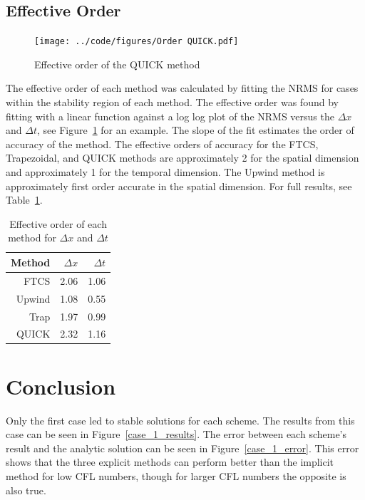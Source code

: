 \documentclass[twocolumn,10pt]{asme2ej}
\begin{document}
\subsection{Effective Order}
\begin{figure}[tb]
\begin{center}
\texttt{[image: ../code/figures/Order QUICK.pdf]}
\caption{Effective order of the QUICK method}
\label{QUICK_order}
\end{center}
\end{figure}
The effective order of each method was calculated by fitting the NRMS for cases within the stability region of each method. The effective order was found by fitting with a linear function against a log log plot of the NRMS versus the $\Delta x$ and $\Delta t$, see Figure~\ref{QUICK_order} for an example. The slope of the fit estimates the order of accuracy of the method. The effective orders of accuracy for the FTCS, Trapezoidal, and QUICK methods are approximately 2 for the spatial dimension and approximately 1 for the temporal dimension. The Upwind method is approximately first order accurate in the spatial dimension. For full results, see Table~\ref{effective_order_table}.

\begin{table}[tb]
\begin{center}
\begin{tabular}{|r | r | r |}
\hline
Method & $\Delta x$ & $\Delta t$ \\
\hline
FTCS    & 2.06 & 1.06 \\
Upwind  & 1.08 & 0.55 \\
Trap    & 1.97 & 0.99 \\
QUICK   & 2.32 & 1.16 \\
\hline
\end{tabular}
\caption{Effective order of each method for $\Delta x$ and $\Delta t$}
\label{effective_order_table}
\end{center}
\end{table}

\section{Conclusion}
Only the first case led to stable solutions for each scheme. The results from this case can be seen in Figure~\ref{case_1_results}. The error between each scheme's result and the analytic solution can be seen in Figure~\ref{case_1_error}. This error shows that the three explicit methods can perform better than the implicit method for low CFL numbers, though for larger CFL numbers the opposite is also true.
\end{document}
